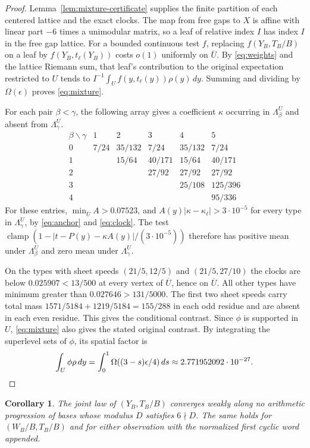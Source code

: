 \documentclass[11pt,reqno]{amsart}
\newtheorem{corollary}[theorem]{Corollary}
\theoremstyle{remark}
\newcommand{\clamp}{\operatorname{clamp}}
\begin{document}
\begin{proof}
Lemma~\ref{lem:mixture-certificate} supplies the finite partition of each centered lattice and the exact clocks. The map from free gaps to \(X\) is affine with linear part \(-6\) times a unimodular matrix, so a leaf of relative index \(I\) has index \(I\) in the free gap lattice. For a bounded continuous test \(f\), replacing \(f(Y_B,T_B/B)\) on a leaf by \(f(Y_B,t_\ell(Y_B))\) costs \(o(1)\) uniformly on \(\overline U\). By \eqref{eq:weights} and the lattice Riemann sum, that leaf's contribution to the original expectation restricted to \(U\) tends to \(I^{-1}\int_U f(y,t_\ell(y))\rho(y)\,dy\). Summing and dividing by \(\Omega(\epsilon)\) proves \eqref{eq:mixture}.

For each pair \(\beta<\gamma\), the following array gives a coefficient \(\kappa\) occurring in \(\Lambda^U_\beta\) and absent from \(\Lambda^U_\gamma\).
\[
\begin{array}{c|ccccc}
 \beta\backslash\gamma &1&2&3&4&5\\ \hline
 0&7/24&35/132&7/24&35/132&7/24\\
 1&&15/64&40/171&15/64&40/171\\
 2&&&27/92&27/92&27/92\\
 3&&&&25/108&125/396\\
 4&&&&&95/336
\end{array}
\]
For these entries, \(\min_{\overline U} A>0.07523\), and \(A(y)|\kappa-\kappa_\ell|>3\cdot10^{-5}\) for every type in \(\Lambda^U_\gamma\), by \eqref{eq:anchor} and \eqref{eq:clock}. The test \(\clamp(1-|t-P(y)-\kappa A(y)|/(3\cdot10^{-5}))\) therefore has positive mean under \(\Lambda^U_\beta\) and zero mean under \(\Lambda^U_\gamma\).

On the types with sheet speeds \((21/5,12/5)\) and \((21/5,27/10)\) the clocks are below \(0.025907<13/500\) at every vertex of \(\overline U\), hence on \(\overline U\). All other types have minimum greater than \(0.027646>131/5000\). The first two sheet speeds carry total mass \(1571/5184+1219/5184=155/288\) in each odd residue and are absent in each even residue. This gives the conditional contrast. Since \(\phi\) is supported in \(U\), \eqref{eq:mixture} also gives the stated original contrast. By integrating the superlevel sets of \(\phi\), its spatial factor is
\[
 \int_U\phi\rho\,dy=\int_0^1 \Omega((3-s)\epsilon/4)\,ds\approx 2.771952092\cdot10^{-27}.\qedhere
\]
\end{proof}

\begin{corollary}\label{cor:progressions}
The joint law of \((Y_B,T_B/B)\) converges weakly along no arithmetic progression of bases whose modulus \(D\) satisfies \(6\nmid D\). The same holds for \((W_B/B,T_B/B)\) and for either observation with the normalized first cyclic word appended.
\end{corollary}
\end{document}
